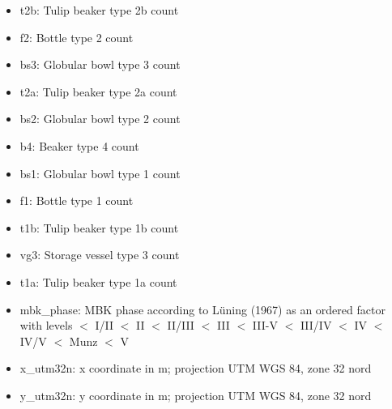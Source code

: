 \documentclass[8pt]{beamer}
\begin{document}
\begin{frame}
\begin{multicols}{3}
\begin{tiny}
\begin{itemize}
\item t2b: Tulip beaker type 2b count
\item f2: Bottle type 2 count
\item bs3: Globular bowl type 3 count
\item t2a: Tulip beaker type 2a count
\item bs2: Globular bowl type 2 count
\item b4: Beaker type 4 count
\item bs1: Globular bowl type 1 count
\item f1: Bottle type 1 count
\item t1b: Tulip beaker type 1b count
\item vg3: Storage vessel type 3 count
\item t1a: Tulip beaker type 1a count
\item mbk\_phase: MBK phase according to Lüning (1967) as an ordered factor with levels $<$ I/II $<$ II $<$ II/III $<$ III $<$ III-V $<$ III/IV $<$ IV $<$ IV/V $<$ Munz $<$ V
\item x\_utm32n: x coordinate in m; projection UTM WGS 84, zone 32 nord
\item y\_utm32n: y coordinate in m; projection UTM WGS 84, zone 32 nord
\end{itemize}

\end{tiny}

\end{multicols}

\end{frame}
\end{document}
